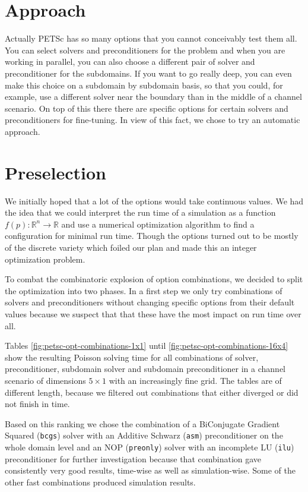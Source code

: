 \section{Approach}

Actually PETSc has so many options that you cannot conceivably test them
all. You can select solvers and preconditioners for the problem and when you are
working in parallel, you can also choose a different pair of solver and
preconditioner for the subdomains. If you want to go really deep, you can even
make this choice on a subdomain by subdomain basis, so that you could, for
example, use a different solver near the boundary than in the middle of a
channel scenario. On top of this there there are specific options for certain
solvers and preconditioners for fine-tuning. In view of this fact, we chose to
try an automatic approach.

\section{Preselection}

We initially hoped that a lot of the options would take continuous values. We
had the idea that we could interpret the run time of a simulation as a function
$f(p) : \mathbb{R}^{n} \rightarrow \mathbb{R}$ and use a numerical optimization
algorithm to find a configuration for minimal run time. Though the options
turned out to be mostly of the discrete variety which foiled our plan and made
this an integer optimization problem.

To combat the combinatoric explosion of option combinations, we decided to split
the optimization into two phases. In a first step we only try combinations of
solvers and preconditioners without changing specific options from their default
values because we suspect that that these have the most impact on run time over
all.

Tables \ref{fig:petsc-opt-combinations-1x1} until
\ref{fig:petsc-opt-combinations-16x4} show the resulting Poisson solving time
for all combinations of solver, preconditioner, subdomain solver and subdomain
preconditioner in a channel scenario of dimensions $5 \times 1$ with an
increasingly fine grid. The tables are of different length, because we filtered
out combinations that either diverged or did not finish in time.

Based on this ranking we chose the combination of a BiConjugate Gradient Squared
(\texttt{bcgs}) solver with an Additive Schwarz (\texttt{asm}) preconditioner on
the whole domain level and an NOP (\texttt{preonly}) solver with an incomplete
LU (\texttt{ilu}) preconditioner for further investigation because that
combination gave consistently very good results, time-wise as well as
simulation-wise. Some of the other fast combinations produced simulation
results.

